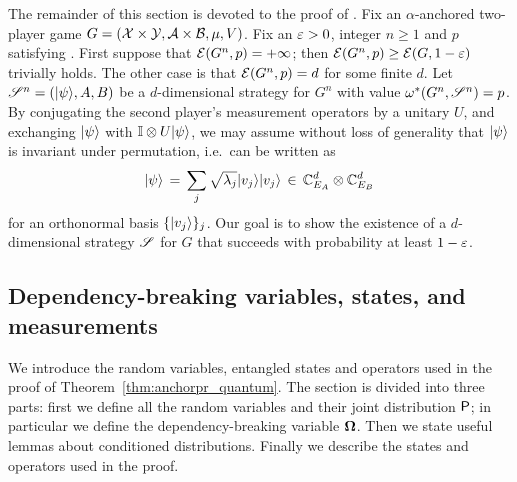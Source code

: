
The remainder of this section is devoted to the proof of . Fix an $\alpha$-anchored two-player game $G = (\X \times \Y,\A \times \B,\mu,V)$. Fix an $\eps > 0$, integer $n\geq 1$ and $p$ satisfying . First suppose that $\E(G^n,p) = +\infty$; then $\E(G^n,p) \geq \E(G,1 - \eps)$ trivially holds. The other case is that $\E(G^n,p) = d$ for some finite $d$. Let $\strategy^n = (\ket{\psi},A,B)$ be a $d$-dimensional strategy for $G^n$ with value $\eval(G^n,\strategy^n) = p$. By conjugating the second player's measurement operators by a unitary $U$, and exchanging $\ket{\psi}$ with $\Id \otimes U \ket{\psi}$, we may assume without loss of generality that $\ket{\psi}$ is  invariant under permutation, i.e.\ can be written as 
\begin{equation}\label{eq:psi-sym}
 \ket{\psi} \,=\, \sum_j \sqrt{\lambda_j} \ket{v_j} \ket{v_j}\,\in \, \C_{E_A}^d \otimes \C_{E_B}^d
\end{equation}
for an orthonormal basis $\{ \ket{v_j} \}_j$. Our goal is to show the existence of a $d$-dimensional strategy $\strategy$ for $G$ that succeeds with probability at least $1 - \eps$. 





\subsection{Dependency-breaking variables, states, and measurements}
\label{sec:quantum_setup}

We introduce the random variables, entangled states and operators used in the proof of Theorem~\ref{thm:anchorpr_quantum}. The section is divided into three parts: first we define all the random variables and their joint distribution $\P$; in particular we define the dependency-breaking variable $\bOmega$. Then we state useful lemmas about conditioned distributions. Finally we describe the states and operators used in the proof.

